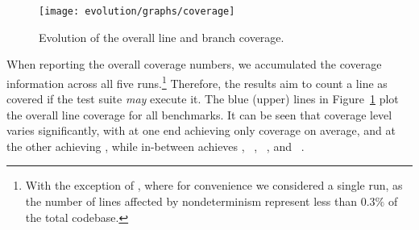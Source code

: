


\begin{figure}[t]
\centering
\texttt{[image: evolution/graphs/coverage]}
\caption{Evolution of the overall line and branch coverage.}
\label{fig:coverage}
\end{figure}

When reporting the overall coverage numbers, we accumulated the
coverage information across all five runs.\footnote{With the exception
of \git, where for convenience we considered a single run, as the
number of lines affected by nondeterminism represent less than
$0.3\%$ of the total codebase.} Therefore, the results aim to count a
line as covered if the test suite {\em may} execute it.  The blue
(upper) lines in Figure~\ref{fig:coverage} plot the overall line
coverage for all benchmarks.  It can be seen that coverage level
varies significantly, with \beanstalkd at one end achieving
only \beanstalkdCoverageAverage coverage on average, and \git at the
other achieving
\gitCoverageAverage, while in-between \lighttpdtwo achieves
\lighttpdtwoCoverageAverage, \redis~\redisCoverageAverage,
\zeromq~\zeromqCoverageAverage, and
\memcached~\memcachedCoverageAverage.

